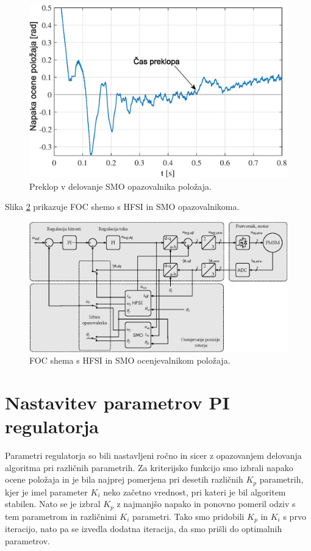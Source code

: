 \documentclass[a4paper,twoside,openright,12pt,slovene]{book}
\begin{document}
\begin{figure}[!htbp]
    \centering
    \includegraphics[width=0.8\columnwidth]{Slike/brezudarniPreklop_Err.eps}
    \caption{\label{brezudarniPreklop_Err} Preklop v delovanje SMO opazovalnika položaja. }
\end{figure}

\newpage
Slika \ref{FOC} prikazuje FOC shemo s HFSI in SMO opazovalnikoma. 

\begin{figure}[!htbp]
    \centering
    \includegraphics[width=0.95\columnwidth]{Slike/Inkscape/FOC.eps}
    \caption{\label{FOC} FOC shema s HFSI in SMO ocenjevalnikom položaja. }
\end{figure}

\newpage
\section{Nastavitev parametrov PI regulatorja}

Parametri regulatorja so bili nastavljeni ročno in sicer z opazovanjem delovanja algoritma pri različnih parametrih. Za kriterijsko funkcijo smo izbrali napako ocene položaja in je bila najprej
pomerjena pri desetih različnih $K_p$ parametrih, kjer je imel parameter $K_i$ neko začetno vrednost, pri kateri je bil algoritem stabilen. Nato se je izbral $K_p$ z najmanjšo napako in ponovno
pomeril odziv s tem parametrom in različnimi $K_i$ parametri. Tako smo pridobili $K_p$ in $K_i$ s prvo iteracijo, nato pa se izvedla dodatna iteracija, da smo prišli do optimalnih parametrov. 
\end{document}
